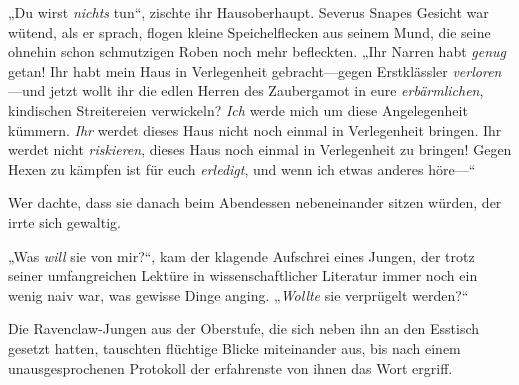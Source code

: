 „Du wirst \emph{nichts} tun“, zischte ihr Hausoberhaupt. Severus Snapes Gesicht war wütend, als er sprach, flogen kleine Speichelflecken aus seinem Mund, die seine ohnehin schon schmutzigen Roben noch mehr befleckten. „Ihr Narren habt \emph{genug} getan! Ihr habt mein Haus in Verlegenheit gebracht—gegen Erstklässler \emph{verloren}—und jetzt wollt ihr die edlen Herren des Zaubergamot in eure \emph{erbärmlichen}, kindischen Streitereien verwickeln? \emph{Ich} werde mich um diese Angelegenheit kümmern. \emph{Ihr} werdet dieses Haus nicht noch einmal in Verlegenheit bringen. Ihr werdet nicht \emph{riskieren}, dieses Haus noch einmal in Verlegenheit zu bringen! Gegen Hexen zu kämpfen ist für euch \emph{erledigt}, und wenn ich etwas anderes höre—“

\later

Wer dachte, dass sie danach beim Abendessen nebeneinander sitzen würden, der irrte sich gewaltig.

„Was \emph{will} sie von mir?“, kam der klagende Aufschrei eines Jungen, der trotz seiner umfangreichen Lektüre in wissenschaftlicher Literatur immer noch ein wenig naiv war, was gewisse Dinge anging. „\emph{Wollte} sie verprügelt werden?“

Die Ravenclaw-Jungen aus der Oberstufe, die sich neben ihn an den Esstisch gesetzt hatten, tauschten flüchtige Blicke miteinander aus, bis nach einem unausgesprochenen Protokoll der erfahrenste von ihnen das Wort ergriff.

